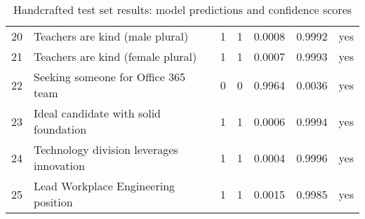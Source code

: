 \begin{table}[H]
\begin{tabular}{clllccr}
20 & Teachers are kind (male plural)          & 1 & 1 & 0.0008 & 0.9992 & yes \\
21 & Teachers are kind (female plural)        & 1 & 1 & 0.0007 & 0.9993 & yes \\
22 & Seeking someone for Office 365 team      & 0 & 0 & 0.9964 & 0.0036 & yes \\
23 & Ideal candidate with solid foundation    & 1 & 1 & 0.0006 & 0.9994 & yes \\
24 & Technology division leverages innovation & 1 & 1 & 0.0004 & 0.9996 & yes \\
25 & Lead Workplace Engineering position      & 1 & 1 & 0.0015 & 0.9985 & yes \\
\bottomrule
\end{tabular}
\caption[Handcrafted test set results]{Handcrafted test set results: model predictions and confidence scores}
\end{table}

